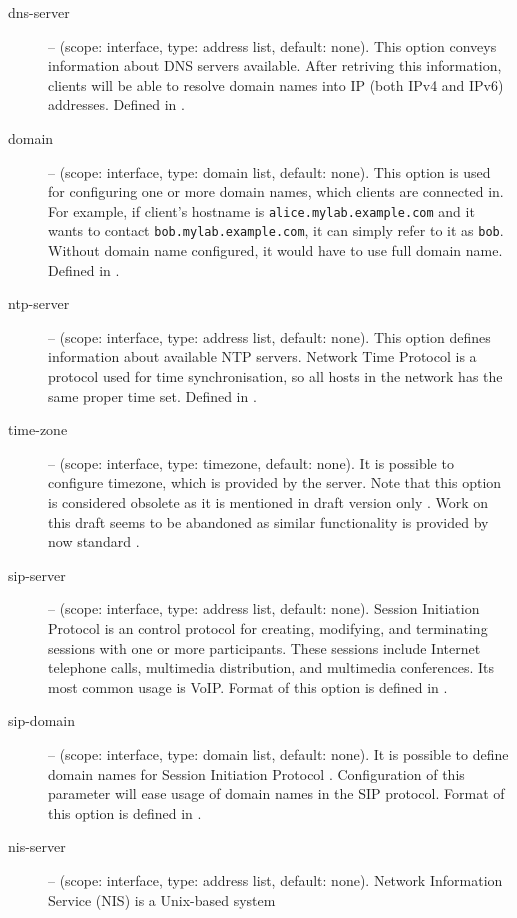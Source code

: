 \begin{description}
 \item[dns-server] -- (scope: interface, type: address list, default:
   none). This option conveys information about DNS servers
   available. After retriving this information, clients will be able
   to resolve domain names into IP (both IPv4 and IPv6)
   addresses. Defined in \cite{rfc3596}.
 \item[domain] -- (scope: interface, type: domain list, default:
   none). This option is used for configuring one or more domain
   names, which clients are connected in. For example, if client's
   hostname is \verb+alice.mylab.example.com+ and it wants to contact
   \verb+bob.mylab.example.com+, it can simply refer to it as
   \verb+bob+. Without domain name configured, it would have to use
   full domain name. Defined in \cite{rfc3596}.
 \item[ntp-server] -- (scope: interface, type: address list, default:
   none). This option defines information about available NTP
   servers. Network Time Protocol \cite{rfc2030} is a protocol used
   for time synchronisation, so all hosts in the network has the same
   proper time set. Defined in \cite{rfc4075}.
 \item[time-zone] -- (scope: interface, type: timezone, default:
   none). It is possible to configure timezone, which is provided by
   the server. Note that this option is considered obsolete as it is
   mentioned in draft version only \cite{draft-timezone}. Work on this
   draft seems to be abandoned as similar functionality is provided by
   now standard \cite{rfc4075}.
 \item[sip-server] -- (scope: interface, type: address list, default:
   none). Session Initiation Protocol \cite{rfc3263} is an control
   protocol for creating, modifying, and terminating sessions with one
   or more participants. These sessions include Internet telephone
   calls, multimedia distribution, and multimedia conferences. Its
   most common usage is VoIP. Format of this option is defined in
   \cite{rfc3319}.
 \item[sip-domain] -- (scope: interface, type: domain list, default:
   none). It is possible to define domain names for Session Initiation
   Protocol \cite{rfc3263}. Configuration of this parameter will ease
   usage of domain names in the SIP protocol. Format of this option is
   defined in \cite{rfc3319}.
 \item[nis-server] -- (scope: interface, type: address list, default:
   none). Network Information Service (NIS) is a Unix-based system

\end{description}
